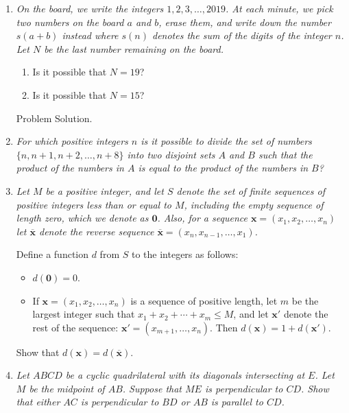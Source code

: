 \documentclass{article}
\begin{document}
\begin{enumerate}

\medskip
\item %
{\itshape On the board, we write the integers $1, 2, 3, \dots, 2019$.
At each minute, we pick two numbers on the board $a$ and $b$, erase them, and write down the number $s(a + b)$ instead where $s(n)$ denotes the sum of the digits of the integer $n$.
Let $N$ be the last number remaining on the board.
\begin{enumerate}
	\item Is it possible that $N = 19$?
	\item Is it possible that $N = 15$?
\end{enumerate}}
Problem Solution.


\medskip
\item %
{\itshape For which positive integers $n$ is it possible to divide the set of numbers $\{n, n+1, n+2, \dotsc, n+8\}$ into two disjoint sets $A$ and $B$ such that the product of the numbers in $A$ is equal to the product of the numbers in $B$?}



\medskip
\item %
{\itshape Let $M$ be a positive integer, and let $S$ denote the set of finite sequences of positive integers less than or equal to $M$, including the empty sequence of length zero, which we denote as $\mathbf{0}$.
Also, for a sequence $\mathbf{x} = (x_1, x_2, \dotsc, x_n)$ let $\overline{\mathbf{x}}$ denote the reverse sequence $\overline{\mathbf{x}} = (x_n, x_{n-1}, \dotsc, x_1)$.

Define a function $d$ from $S$ to the integers as follows:
\begin{itemize}
\item $d(\mathbf{0}) = 0$.
\item If $\mathbf{x} = (x_1, x_2, \dotsc, x_n)$ is a sequence of positive length, let $m$ be the largest integer such that $x_1 +x_2 +\dotsb +x_m \leq M$, and let $\mathbf{x}'$ denote the rest of the sequence: $\mathbf{x}' = (x_{m+1}, \dotsc, x_n)$.
Then $d(\mathbf{x}) = 1 +d(\mathbf{x}')$.
\end{itemize}
Show that $d(\mathbf{x}) = d(\overline{\mathbf{x}})$.}



\medskip
\item
{\itshape Let $ABCD$ be a cyclic quadrilateral with its diagonals intersecting at $E$.
Let $M$ be the midpoint of $AB$.
Suppose that $ME$ is perpendicular to $CD$.
Show that either $AC$ is perpendicular to $BD$ or $AB$ is parallel to $CD$.}




\end{enumerate}
\end{document}
